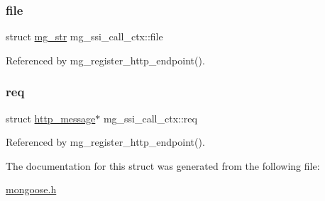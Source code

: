 \subsubsection{\texorpdfstring{file}{file}}
{\footnotesize\ttfamily struct \hyperlink{structmg__str}{mg\+\_\+str} mg\+\_\+ssi\+\_\+call\+\_\+ctx\+::file}



Referenced by mg\+\_\+register\+\_\+http\+\_\+endpoint().

\mbox{\label{structmg__ssi__call__ctx_ae4f6225598743855f1da5103a5640302_ae4f6225598743855f1da5103a5640302}} 
\subsubsection{\texorpdfstring{req}{req}}
{\footnotesize\ttfamily struct \hyperlink{structhttp__message}{http\+\_\+message}$\ast$ mg\+\_\+ssi\+\_\+call\+\_\+ctx\+::req}



Referenced by mg\+\_\+register\+\_\+http\+\_\+endpoint().



The documentation for this struct was generated from the following file\+:\begin{DoxyCompactItemize}
\item 
\hyperlink{mongoose_8h}{mongoose.\+h}\end{DoxyCompactItemize}
